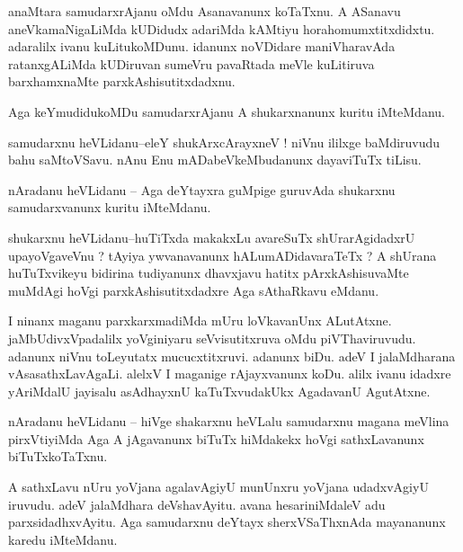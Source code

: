 \documentclass{article}
\begin{document}
\begin{mn}%
anaMtara samudarxrAjanu oMdu Asanavanunx koTaTxnu. A ASanavu aneVkamaNigaLiMda kUDidudx 
adariMda kAMtiyu horahomumxtitxdidxtu. adaralilx  ivanu kuLitukoMDunu. idanunx noVDidare
maniVharavAda ratanxgALiMda kUDiruvan sumeVru pavaRtada meVle kuLitiruva barxhamxnaMte 
parxkAshisutitxdadxnu.
\end{mn}

\begin{mn}%
Aga keYmudidukoMDu samudarxrAjanu A shukarxnanunx kuritu iMteMdanu.
\end{mn}

\begin{mn}%
samudarxnu heVLidanu--eleY shukArxcArayxneV ! niVnu ililxge baMdiruvudu bahu saMtoVSavu. nAnu 
Enu mADabeVkeMbudanunx dayaviTuTx tiLisu.
\end{mn}

\begin{mn}%
nAradanu heVLidanu -- Aga deYtayxra guMpige guruvAda shukarxnu samudarxvanunx kuritu iMteMdanu.
\end{mn}

\begin{mn}%
shukarxnu heVLidanu--huTiTxda makakxLu avareSuTx shUrarAgidadxrU upayoVgaveVnu ? tAyiya 
ywvanavanunx hALumADidavaraTeTx ? A shUrana huTuTxvikeyu bidirina tudiyanunx dhavxjavu 
hatitx pArxkAshisuvaMte muMdAgi hoVgi parxkAshisutitxdadxre Aga sAthaRkavu eMdanu.
\end{mn}

\begin{mn}%
I ninanx maganu parxkarxmadiMda mUru loVkavanUnx ALutAtxne. jaMbUdivxVpadalilx yoVginiyaru 
seVvisutitxruva oMdu piVThaviruvudu. adanunx niVnu toLeyutatx mucucxtitxruvi. adanunx biDu. 
adeV I jalaMdharana vAsasathxLavAgaLi. alelxV I maganige rAjayxvanunx koDu. alilx ivanu 
idadxre yAriMdalU jayisalu asAdhayxnU kaTuTxvudakUkx AgadavanU AgutAtxne.
\end{mn}

\begin{mn}%
nAradanu heVLidanu -- hiVge shakarxnu heVLalu samudarxnu magana meVlina pirxVtiyiMda Aga A 
jAgavanunx biTuTx hiMdakekx hoVgi sathxLavanunx biTuTxkoTaTxnu.
\end{mn}

\begin{mn}%
A sathxLavu nUru yoVjana agalavAgiyU munUnxru yoVjana udadxvAgiyU iruvudu. adeV jalaMdhara 
deVshavAyitu. avana hesariniMdaleV adu parxsidadhxvAyitu. Aga samudarxnu deYtayx 
sherxVSaThxnAda mayananunx karedu iMteMdanu.
\end{mn}
\end{document}
